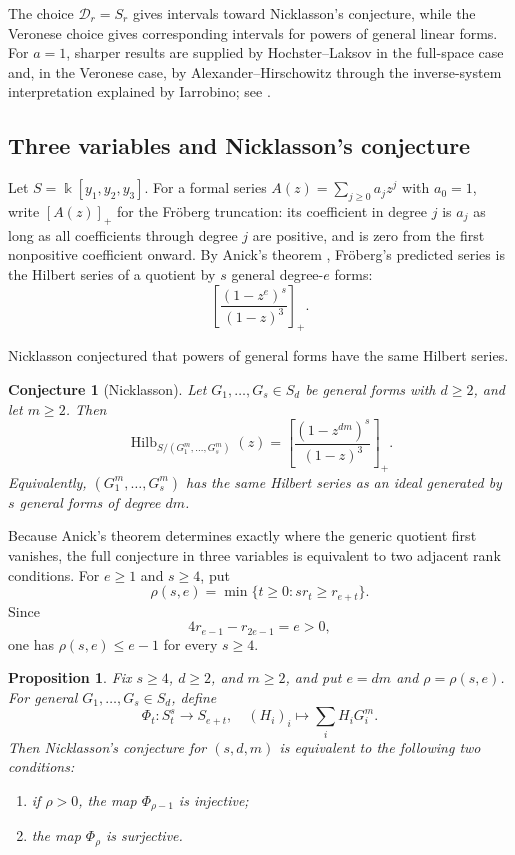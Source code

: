 \documentclass[11pt]{amsart}
\newtheorem{proposition}[theorem]{Proposition}
\newtheorem{conjecture}[theorem]{Conjecture}
\theoremstyle{remark}
\newcommand{\kk}{\Bbbk}
\newcommand{\Hilb}{\operatorname{Hilb}}
\begin{document}
The choice $\mathcal D_r=S_r$ gives intervals toward Nicklasson's conjecture, while the Veronese choice gives corresponding intervals for powers of general linear forms. For $a=1$, sharper results are supplied by Hochster--Laksov in the full-space case and, in the Veronese case, by Alexander--Hirschowitz through the inverse-system interpretation explained by Iarrobino; see \cite{AH, HochsterLaksov,IarrobinoII}.

\subsection{Three variables and Nicklasson's conjecture}\label{subsec:Nicklasson}

Let $S=\kk[y_1,y_2,y_3]$. For a formal series $A(z)=\sum_{j\ge0}a_jz^j$ with $a_0=1$, write $[A(z)]_+$ for the Fr\"oberg truncation: its coefficient in degree $j$ is $a_j$ as long as all coefficients through degree $j$ are positive, and is zero from the first nonpositive coefficient onward. By Anick's theorem \cite{Anick}, Fr\"oberg's predicted series \cite{Froberg} is the Hilbert series of a quotient by $s$ general degree-$e$ forms:
$$
\left[\frac{(1-z^e)^s}{(1-z)^3}\right]_+.
$$

Nicklasson \cite{Nicklasson} conjectured that powers of general forms have the same Hilbert series.

\begin{conjecture}[Nicklasson]\label{conj:Nicklasson}
Let $G_1,\ldots,G_s\in S_d$ be general forms with $d\ge2$, and let $m\ge2$. Then
\begin{equation}\label{eq:Nicklasson-conj}
\Hilb_{S/(G_1^m,\ldots,G_s^m)}(z)
=
\left[\frac{(1-z^{dm})^s}{(1-z)^3}\right]_+.
\end{equation}
Equivalently, $(G_1^m,\ldots,G_s^m)$ has the same Hilbert series as an ideal generated by $s$ general forms of degree $dm$.
\end{conjecture}

Because Anick's theorem determines exactly where the generic quotient first vanishes, the full conjecture in three variables is equivalent to two adjacent rank conditions. For $e\ge1$ and $s\ge4$, put
\begin{equation}\label{eq:rho-critical}
\rho(s,e)=\min\{t\ge0:s r_t\ge r_{e+t}\}.
\end{equation}
Since
$$
4r_{e-1}-r_{2e-1}=e>0,
$$
one has $\rho(s,e)\le e-1$ for every $s\ge4$.

\begin{proposition}\label{prop:Nicklasson-two-maps}
Fix $s\ge4$, $d\ge2$, and $m\ge2$, and put $e=dm$ and $\rho=\rho(s,e)$. For general $G_1,\ldots,G_s\in S_d$, define
$$
\Phi_t:S_t^s\longrightarrow S_{e+t},
\quad
(H_i)_i\longmapsto\sum_iH_iG_i^m.
$$
Then Nicklasson's conjecture for $(s,d,m)$ is equivalent to the following two conditions:
\begin{enumerate}
\item if $\rho>0$, the map $\Phi_{\rho-1}$ is injective;
\item the map $\Phi_\rho$ is surjective.
\end{enumerate}
\end{proposition}
\end{document}
